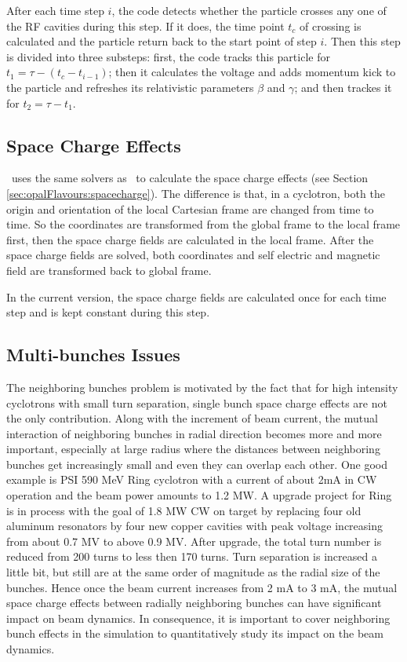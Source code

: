 After each time step $i$, the code detects whether the particle crosses any one of the RF cavities during this step.
If it does, the time point $t_c$ of crossing is calculated and the particle return back to the start point of 
step $i$. Then this step is divided into three substeps:
first, the code tracks this particle for $ t_1 = \tau - (t_c-t_{i-1})$;
then it calculates the voltage and adds momentum kick to the particle and refreshes its relativistic parameters $\beta$ and $\gamma$; 
and then trackes it for $t_2 = \tau - t_1$. 

\subsection{Space Charge Effects}  

\opalcycl\ uses the same solvers as \opalt\ to calculate the space charge effects (see Section \ref{sec:opalFlavours:spacecharge}).
The difference is that, in a cyclotron,
both the origin and orientation of the local Cartesian frame are changed from time to time. So the coordinates are transformed from 
the global frame to the local frame first, then the space charge fields are calculated in the local frame. 
After the space charge fields are solved, both coordinates and self electric and magnetic field are transformed back to global frame.
 
In the current version, the space charge fields are calculated once for each time step and is kept constant during this step.      

\subsection{Multi-bunches Issues}
\label{sec:opalcycl:MultiBunch}
				   
The neighboring bunches problem is motivated by the fact that for high intensity cyclotrons with small turn
separation, single bunch space charge effects are not the only contribution. Along with the increment of beam
current, the mutual interaction of neighboring bunches in radial direction becomes more and more important,
especially at large radius where the distances between neighboring bunches get increasingly small and even they
can overlap each other. One good example is PSI 590 MeV Ring cyclotron with a current of about 2mA in
CW operation and the beam power amounts to 1.2 MW. A upgrade project for Ring is in process with
the goal of 1.8 MW CW on target by replacing four old aluminum resonators by four new copper cavities with peak
voltage increasing from about 0.7 MV to above 0.9 MV. After upgrade, the total turn 
number is reduced from 200 turns to less then 170 turns. 
Turn separation is increased a little bit, but still are at the same order 
of magnitude as the radial size of the bunches. Hence once the beam current increases from 2 mA to 3 mA, the mutual space
charge effects between radially neighboring bunches can have significant impact on beam dynamics.
In consequence, it is important to cover neighboring bunch effects in the simulation to quantitatively study its impact on the beam dynamics.

